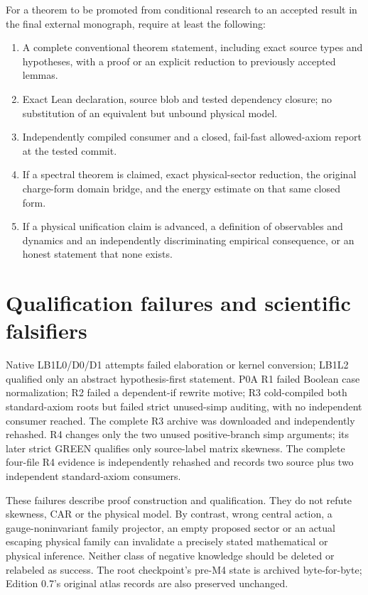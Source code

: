 For a theorem to be promoted from conditional research to an accepted
result in the final external monograph, require at least the following:
\begin{enumerate}[leftmargin=1.6em]
 \item A complete conventional theorem statement, including exact
 source types and hypotheses, with a proof or an explicit reduction
 to previously accepted lemmas.
 \item Exact Lean declaration, source blob and tested dependency
 closure; no substitution of an equivalent but unbound physical model.
 \item Independently compiled consumer and a closed, fail-fast
 allowed-axiom report at the tested commit.
 \item If a spectral theorem is claimed, exact physical-sector
 reduction, the original charge-form domain bridge, and the energy
 estimate on that same closed form.
 \item If a physical unification claim is advanced, a definition of
 observables and dynamics and an independently discriminating
 empirical consequence, or an honest statement that none exists.
\end{enumerate}


\section{Qualification failures and scientific falsifiers}
Native LB1L0/D0/D1 attempts failed elaboration or kernel conversion;
LB1L2 qualified only an abstract hypothesis-first statement. P0A R1
failed Boolean case normalization; R2 failed a dependent-if rewrite
motive; R3 cold-compiled both standard-axiom roots but failed strict
unused-simp auditing, with no independent consumer reached. The
complete R3 archive was downloaded and independently rehashed.
R4 changes only the two unused positive-branch simp arguments;
its later strict GREEN qualifies only source-label matrix skewness.
The complete four-file R4 evidence is independently rehashed and
records two source plus two independent standard-axiom consumers.

These failures describe proof construction and qualification. They
do not refute skewness, CAR or the physical model. By contrast,
wrong central action, a gauge-noninvariant family projector, an
empty proposed sector or an actual escaping physical family can
invalidate a precisely stated mathematical or physical inference.
Neither class of negative knowledge should be deleted or relabeled
as success. The root checkpoint's pre-M4 state is archived byte-for-byte;
Edition 0.7's original atlas records are also preserved unchanged.
